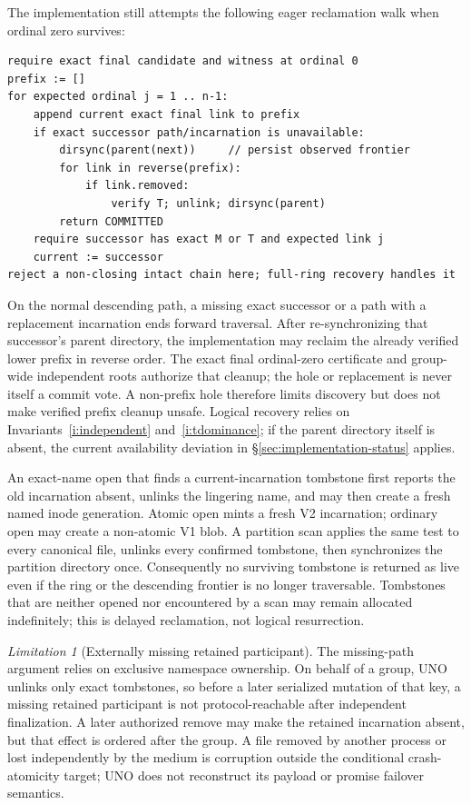 \documentclass[10pt,twocolumn]{article}
\theoremstyle{remark}
\newtheorem{limitation}{Limitation}
\begin{document}
The implementation still attempts the following eager reclamation walk when ordinal zero survives:

\begin{lstlisting}[style=protocol,caption={Recover an ordered delete frontier from ordinal zero.}]
require exact final candidate and witness at ordinal 0
prefix := []
for expected ordinal j = 1 .. n-1:
    append current exact final link to prefix
    if exact successor path/incarnation is unavailable:
        dirsync(parent(next))     // persist observed frontier
        for link in reverse(prefix):
            if link.removed:
                verify T; unlink; dirsync(parent)
        return COMMITTED
    require successor has exact M or T and expected link j
    current := successor
reject a non-closing intact chain here; full-ring recovery handles it
\end{lstlisting}

On the normal descending path, a missing exact successor or a path with a replacement incarnation
ends forward traversal. After re-synchronizing that successor's parent directory, the implementation
may reclaim the already verified lower prefix in reverse order. The exact final ordinal-zero
certificate and group-wide independent roots authorize that cleanup; the hole or replacement is
never itself a commit vote. A non-prefix hole therefore limits discovery but does not make verified
prefix cleanup unsafe. Logical recovery relies on Invariants~\ref{i:independent}
and~\ref{i:tdominance}; if the parent directory itself is absent, the current availability
deviation in \S\ref{sec:implementation-status} applies.

An exact-name open that finds a current-incarnation tombstone first reports the old incarnation
absent, unlinks the lingering name, and may then create a fresh named inode generation. Atomic open
mints a fresh V2 incarnation; ordinary open may create a non-atomic V1 blob. A partition scan applies the same
test to every canonical file, unlinks every confirmed tombstone, then synchronizes the partition
directory once. Consequently no surviving tombstone is returned as live even if the ring or the
descending frontier is no longer traversable. Tombstones that are neither opened nor encountered
by a scan may remain allocated indefinitely; this is delayed reclamation, not logical resurrection.

\begin{limitation}[Externally missing retained participant]\label{l:externalmissing}
The missing-path argument relies on exclusive namespace ownership. On behalf of a group, UNO
unlinks only exact tombstones, so before a later serialized mutation of that key, a missing retained
participant is not protocol-reachable after independent finalization. A later authorized remove may
make the retained incarnation absent, but that effect is ordered after the group. A file removed by
another process or lost independently by the medium is corruption outside the conditional
crash-atomicity target; UNO does not reconstruct its payload or promise failover semantics.
\end{limitation}
\end{document}
